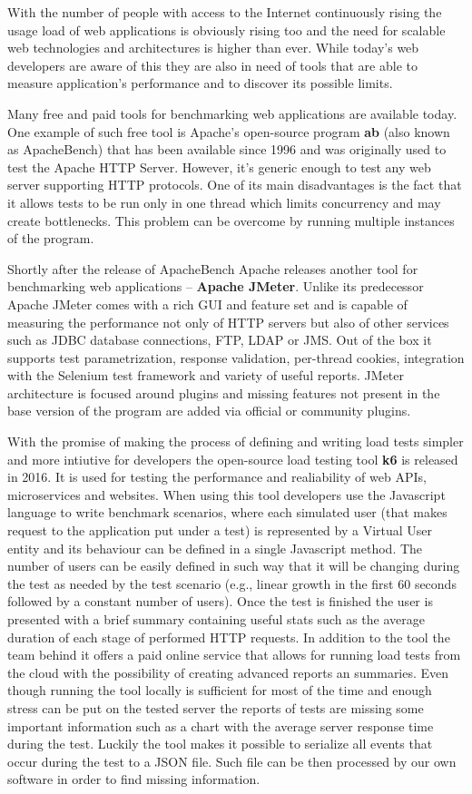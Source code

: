 \documentclass[12pt, a4paper]{article}
\begin{document}
With the number of people with access to the Internet continuously rising the usage load of web applications is obviously rising too and the need for scalable web technologies and architectures is higher than ever.
While today's web developers are aware of this they are also in need of tools that are able to measure application's performance and to discover its possible limits.

Many free and paid tools for benchmarking web applications are available today.
One example of such free tool is Apache's open-source program \textbf{ab} (also known as ApacheBench) that has been available since 1996 and was originally used to test the Apache HTTP Server.
However, it's generic enough to test any web server supporting HTTP protocols.
One of its main disadvantages is the fact that it allows tests to be run only in one thread which limits concurrency and may create bottlenecks.
This problem can be overcome by running multiple instances of the program.

Shortly after the release of ApacheBench Apache releases another tool for benchmarking web applications -- \textbf{Apache JMeter}.
Unlike its predecessor Apache JMeter comes with a rich GUI and feature set and is capable of measuring the performance not only of HTTP servers but also of other services such as JDBC database connections, FTP, LDAP or JMS.
Out of the box it supports test parametrization, response validation, per-thread cookies, integration with the Selenium test framework and variety of useful reports.
JMeter architecture is focused around plugins and missing features not present in the base version of the program are added via official or community plugins.

With the promise of making the process of defining and writing load tests simpler and more intiutive for developers the open-source load testing tool \textbf{k6} is released in 2016.
It is used for testing the performance and realiability of web APIs, microservices and websites.
When using this tool developers use the Javascript language to write benchmark scenarios, where each simulated user (that makes request to the application put under a test) is represented by a Virtual User entity and its behaviour can be defined in a single Javascript method.
The number of users can be easily defined in such way that it will be changing during the test as needed by the test scenario (e.g., linear growth in the first 60 seconds followed by a constant number of users).
Once the test is finished the user is presented with a brief summary containing useful stats such as the average duration of each stage of performed HTTP requests.
In addition to the tool the team behind it offers a paid online service that allows for running load tests from the cloud with the possibility of creating advanced reports an summaries.
Even though running the tool locally is sufficient for most of the time and enough stress can be put on the tested server the reports of tests are missing some important information such as a chart with the average server response time during the test.
Luckily the tool makes it possible to serialize all events that occur during the test to a JSON file.
Such file can be then processed by our own software in order to find missing information. 
\end{document}
